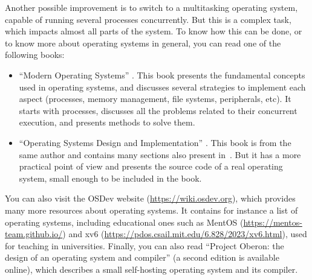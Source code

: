 Another possible improvement is to switch to a multitasking operating system,
capable of running several processes concurrently. But this is a complex task,
which impacts almost all parts of the system. To know how this can be done, or
to know more about operating systems in general, you can read one of the
following books:
\begin{itemize}
  \item ``Modern Operating Systems'' \cite{ModernOSes}. This book presents the
  fundamental concepts used in operating systems, and discusses several
  strategies to implement each aspect (processes, memory management, file
  systems, peripherals, etc). It starts with processes, discusses all the
  problems related to their concurrent execution, and presents methods to solve
  them.

  \item ``Operating Systems Design and Implementation'' \cite{Minix}. This book
  is from the same author and contains many sections also present
  in~\cite{ModernOSes}. But it has a more practical point of view and presents
  the source code of a real operating system, small enough to be included in
  the book.
\end{itemize}

You can also visit the OSDev website (\url{https://wiki.osdev.org}), which
provides many more resources about operating systems. It contains for instance
a list of operating systems, including educational ones such as MentOS
(\url{https://mentos-team.github.io/}) and xv6
(\url{https://pdos.csail.mit.edu/6.828/2023/xv6.html}), used for teaching in
universities. Finally, you can also read ``Project Oberon: the design of an
operating system and compiler'' \cite{Oberon} (a second edition is available
online), which describes a small self-hosting operating system and its compiler.

